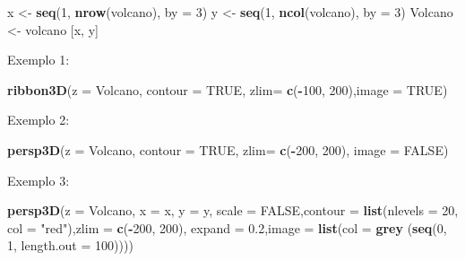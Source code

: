 \documentclass[
]{book}
\newenvironment{Shaded}{\begin{snugshade}}{\end{snugshade}}
\newcommand{\DataTypeTok}[1]{\textcolor[rgb]{0.13,0.29,0.53}{#1}}
\newcommand{\DecValTok}[1]{\textcolor[rgb]{0.00,0.00,0.81}{#1}}
\newcommand{\FloatTok}[1]{\textcolor[rgb]{0.00,0.00,0.81}{#1}}
\newcommand{\KeywordTok}[1]{\textcolor[rgb]{0.13,0.29,0.53}{\textbf{#1}}}
\newcommand{\NormalTok}[1]{#1}
\newcommand{\OperatorTok}[1]{\textcolor[rgb]{0.81,0.36,0.00}{\textbf{#1}}}
\newcommand{\OtherTok}[1]{\textcolor[rgb]{0.56,0.35,0.01}{#1}}
\newcommand{\StringTok}[1]{\textcolor[rgb]{0.31,0.60,0.02}{#1}}
\begin{document}
\begin{Shaded}
\begin{Highlighting}[]
\NormalTok{x <-}\StringTok{ }\KeywordTok{seq}\NormalTok{(}\DecValTok{1}\NormalTok{, }\KeywordTok{nrow}\NormalTok{(volcano), }\DataTypeTok{by =} \DecValTok{3}\NormalTok{)}
\NormalTok{y <-}\StringTok{ }\KeywordTok{seq}\NormalTok{(}\DecValTok{1}\NormalTok{, }\KeywordTok{ncol}\NormalTok{(volcano), }\DataTypeTok{by =} \DecValTok{3}\NormalTok{) }
\NormalTok{Volcano <-}\StringTok{ }\NormalTok{volcano [x, y]}
\end{Highlighting}
\end{Shaded}

Exemplo 1:

\begin{Shaded}
\begin{Highlighting}[]
\KeywordTok{ribbon3D}\NormalTok{(}\DataTypeTok{z =}\NormalTok{ Volcano, }\DataTypeTok{contour =} \OtherTok{TRUE}\NormalTok{, }\DataTypeTok{zlim=} \KeywordTok{c}\NormalTok{(}\OperatorTok{-}\DecValTok{100}\NormalTok{, }\DecValTok{200}\NormalTok{),}\DataTypeTok{image =} \OtherTok{TRUE}\NormalTok{)}
\end{Highlighting}
\end{Shaded}

Exemplo 2:

\begin{Shaded}
\begin{Highlighting}[]
\KeywordTok{persp3D}\NormalTok{(}\DataTypeTok{z =}\NormalTok{ Volcano, }\DataTypeTok{contour =} \OtherTok{TRUE}\NormalTok{, }\DataTypeTok{zlim=} \KeywordTok{c}\NormalTok{(}\OperatorTok{-}\DecValTok{200}\NormalTok{, }\DecValTok{200}\NormalTok{), }\DataTypeTok{image =} \OtherTok{FALSE}\NormalTok{)}
\end{Highlighting}
\end{Shaded}

Exemplo 3:

\begin{Shaded}
\begin{Highlighting}[]
\KeywordTok{persp3D}\NormalTok{(}\DataTypeTok{z =}\NormalTok{ Volcano, }\DataTypeTok{x =}\NormalTok{ x, }\DataTypeTok{y =}\NormalTok{ y, }\DataTypeTok{scale =} \OtherTok{FALSE}\NormalTok{,}\DataTypeTok{contour =} \KeywordTok{list}\NormalTok{(}\DataTypeTok{nlevels =} \DecValTok{20}\NormalTok{, }\DataTypeTok{col =} \StringTok{"red"}\NormalTok{),}\DataTypeTok{zlim =} \KeywordTok{c}\NormalTok{(}\OperatorTok{-}\DecValTok{200}\NormalTok{, }\DecValTok{200}\NormalTok{), }\DataTypeTok{expand =} \FloatTok{0.2}\NormalTok{,}\DataTypeTok{image =} \KeywordTok{list}\NormalTok{(}\DataTypeTok{col =} \KeywordTok{grey}\NormalTok{ (}\KeywordTok{seq}\NormalTok{(}\DecValTok{0}\NormalTok{, }\DecValTok{1}\NormalTok{, }\DataTypeTok{length.out =} \DecValTok{100}\NormalTok{))))}
\end{Highlighting}
\end{Shaded}
\end{document}

